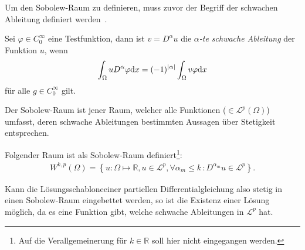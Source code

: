 Um den Sobolew-Raum zu definieren, muss zuvor der Begriff der schwachen Ableitung definiert werden~\cite[nach][S. 13f.]{korobkov_steady_2024}.
\begin{Definitionbox}[]
    Sei $\varphi\in C^{\infty}_0$ eine Testfunktion, dann ist $v=D^{\alpha} u$ die \emph{$\alpha$-te schwache Ableitung} der Funktion $u$, wenn
    \begin{align*}
        \int_{\Omega}{uD^{\alpha}\varphi \text{d}{x}}=(-1)^{|\alpha|} \int_{\Omega}{v\varphi \text{d} x}
    \end{align*}
    für alle $g\in C^{\infty}_0$ gilt.
\end{Definitionbox}
Der Sobolew-Raum ist jener Raum, welcher alle Funktionen ($\in \mathcal{L}^p (\Omega)$) umfasst, deren schwache Ableitungen bestimmten Aussagen über Stetigkeit entsprechen.
\begin{Definitionbox}[]
    Folgender Raum ist als Sobolew-Raum definiert\footnote{Auf die Verallgemeinerung für $k\in \mathbb{R}$ soll hier nicht eingegangen werden.}:
    \begin{align*}
    W^{k,p}(\Omega) = \left\{ u:\Omega \mapsto \mathbb{R}, u \in \mathcal{L}^p , \forall \alpha_m \leq k \,: D^{\alpha_m}u \in \mathcal{L}^p \right\}.
    \end{align*}
\end{Definitionbox}
Kann die \glqq Lösungsschablone\grqq einer partiellen Differentialgleichung also stetig in einen Sobolew-Raum eingebettet werden, so ist die Existenz einer Lösung möglich, da es eine Funktion gibt, welche schwache Ableitungen in $\mathcal{L}^p$ hat.

